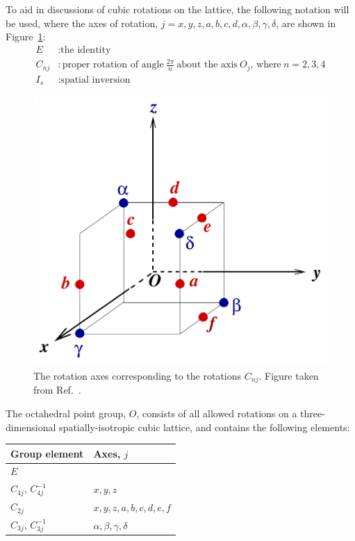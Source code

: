     To aid in discussions of cubic rotations on the lattice, the following notation will be used, where the axes of rotation, $j = x,y,z,a,b,c,d,\alpha,\beta,\gamma,\delta$, are shown in Figure~\ref{fig:rotation_axes}:
    \begin{equation}
        \begin{aligned}
            E &: \text{the identity}\\
            C_{nj} &: \text{proper rotation of angle}\ \frac{2\pi}{n}\ \text{about the axis}\ O_j\text{, where}\ n = 2,3,4 \\
            I_s &: \text{spatial inversion}
        \end{aligned}
    \end{equation}
    \begin{figure}
        \centering
        \includegraphics[scale=0.5]{figures/Oaxes.pdf}
        \caption[The rotation axes corresponding to the rotations $C_{nj}$.]{The rotation axes corresponding to the rotations $C_{nj}$. Figure taken from Ref.~\cite{spectroscopy}.}
        \label{fig:rotation_axes}
    \end{figure}
    The octahedral point group, $O$, consists of all allowed rotations on a three-dimensional spatially-isotropic cubic lattice, and contains the following elements:
    \begin{table}[h!]
        \centering
        \begin{tabular}{l|l}
            Group element & Axes, $j$\\
            \hline
            $E$ & \\
            $C_{4j}$, $C_{4j}^{-1}$ & $x,y,z$ \\
            $C_{2j}$ & $x,y,z,a,b,c,d,e,f$ \\
            $C_{3j}$, $C_{3j}^{-1}$ & $\alpha,\beta,\gamma,\delta$
        \end{tabular}
        \label{table:O}
    \end{table}


